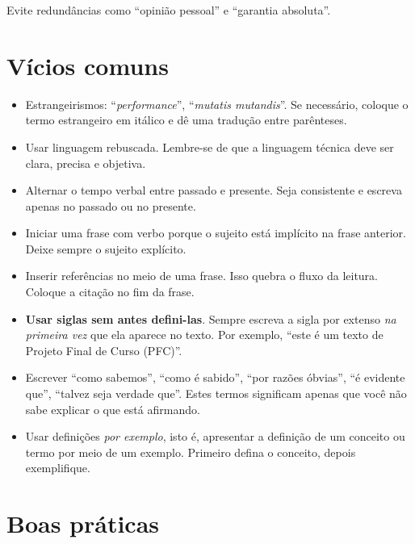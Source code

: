 Evite redundâncias como ``opinião pessoal'' e ``garantia absoluta''.

\section{Vícios comuns}

\begin{itemize}
\item Estrangeirismos: ``\emph{performance}'', ``\emph{mutatis mutandis}''. Se necessário, coloque o termo estrangeiro em itálico e dê uma tradução entre parênteses.

\item Usar linguagem rebuscada. Lembre-se de que a linguagem técnica deve ser clara, precisa e objetiva.

\item Alternar o tempo verbal entre passado e presente. Seja consistente e escreva apenas no passado ou no presente.

\item Iniciar uma frase com verbo porque o sujeito está implícito na frase anterior. Deixe sempre o sujeito explícito.

\item Inserir referências no meio de uma frase. Isso quebra o fluxo da leitura. Coloque a citação no fim da frase.

\item \textbf{Usar siglas sem antes defini-las}. Sempre escreva a sigla por extenso \emph{na primeira vez} que ela aparece no texto. Por exemplo, ``este é um texto de Projeto Final de Curso (PFC)''. 

\item Escrever ``como sabemos'', ``como é sabido'', ``por razões óbvias'', ``é evidente que'', ``talvez seja verdade que''. Estes termos significam apenas que você não sabe explicar o que está afirmando.

\item Usar definições \emph{por exemplo}, isto é, apresentar a definição de um conceito ou termo por meio de um exemplo. Primeiro defina o conceito, depois exemplifique.

\end{itemize}

\section{Boas práticas}

